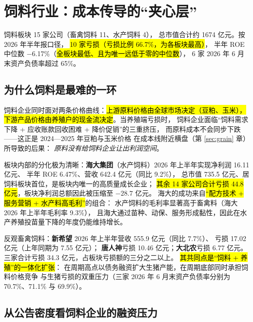 \section{饲料行业：成本传导的“夹心层”}
\label{sec:feed}

饲料板块 \num{15} 家公司（畜禽饲料 \num{11}、水产饲料 \num{4}），
总市值合计约 \num{1674} 亿元。按 2026 年半年报口径，
\hl{\num{10} 家亏损（亏损比例 \num{66.7}\%，为各板块最高）}，
半年 ROE 中位数 \num{-6.17}\%（\hl{全板块最低、且为唯一远低于零的中位数}），
\num{6} 家 2026 年 6 月末资产负债率超过 \num{65}\%。



\subsection{为什么饲料是最难的一环}
\label{sec:feed-squeeze}

饲料企业同时面对两条价格曲线：\hl{上游原料价格由全球市场决定（豆粕、玉米），
下游产品价格由养殖户的现金流决定}。当养殖端亏损时，
饲料企业面临“饲料需求下降 + 应收账款回收困难 + 降价促销”的三重挤压，
而原料成本不会同步下跌——这正是 2024---2025 年豆粕与玉米价格
在成本线附近横盘（第 \ref{sec:grain} 章）所导致的后果：
\emph{原料没有给饲料企业让出利润空间}。

板块内部的分化极为清晰：\textbf{海大集团}（水产饲料）2026 年上半年实现净利润 \num{16.11} 亿元、
半年 ROE \num{6.47}\%、营收 \num{642.4} 亿元（同比 \num{+9.2}\%），
总市值 \num{735.5} 亿元、居饲料板块首位，是板块内唯一的高质量成长企业；
\hl{其余 \num{14} 家公司合计亏损 \num{44.8} 亿元}，板块净利润总额因此被压缩至 $-28.7$ 亿元。
海大的成功来自\hl{“配方技术 + 服务营销 + 水产料高毛利”}的组合：
水产饲料的毛利率显著高于畜禽料（海大 2026 年上半年毛利率 \num{9.3}\%），
且海大通过苗种、动保、服务形成黏性，因此在水产养殖投苗量下降的年度仍能维持增长。

反观畜禽饲料：\textbf{新希望} 2026 年上半年营收 \num{555.9} 亿元（同比 \num{+7.7}\%）、
亏损 \num{17.02} 亿元（上年同期为 \num{+7.55} 亿元）；
\textbf{唐人神}亏损 \num{10.46} 亿元；\textbf{大北农}亏损 \num{6.77} 亿元。
三家合计亏损 \num{34.3} 亿元，占板块亏损额的三分之二以上。
\hl{其共同点是“饲料 + 养殖”的一体化扩张}：
在周期高点以债务融资扩大生猪产能，在周期底部同时承担饲料价格竞争
与生猪亏损的双重压力（三家 2026 年 6 月末资产负债率分别为
\num{70.7}\%、\num{71.1}\% 与 \num{69.9}\%）。

\subsection{从公告密度看饲料企业的融资压力}
\label{sec:feed-signals}

